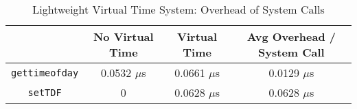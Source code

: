 \begin{table*}
    \centering
    \caption{Lightweight Virtual Time System: Overhead of System Calls}
    \begin{tabular}{c|c|c|c}
        \hline
        & No Virtual Time & Virtual Time & Avg Overhead / System Call \\%
        \hline
        \hline
        \texttt{gettimeofday}  & 0.0532 $\mu$s & 0.0661 $\mu$s & 0.0129 $\mu$s\\%
        \hline
        \texttt{setTDF} & 0  & 0.0628 $\mu$s & 0.0628 $\mu$s\\%
        \hline
    \end{tabular}
    \label{VT:Tab:Overhead}
\end{table*}

